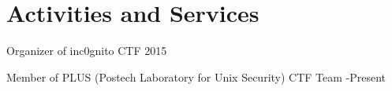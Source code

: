 \section*{Activities and Services}
\begin{description}
  \item Organizer of inc0gnito CTF 2015

  \item Member of PLUS (Postech Laboratory for Unix Security) CTF Team 
  -Present
\end{description}
